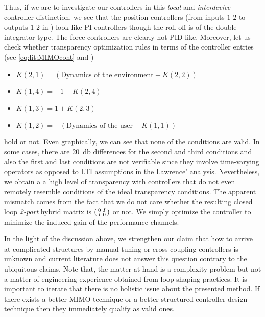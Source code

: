 Thus, if we are to investigate our controllers in this \emph{local} and \emph{interdevice} controller distinction, we see that the position 
controllers (from inputs $1$-$2$ to outputs $1$-$2$ in ) look like PI controllers though the roll-off is of the double
integrator type. The force controllers are clearly not PID-like. Moreover, let us check whether transparency optimization rules in terms of the 
controller entries (see \eqref{eq:lit:MIMOcont} and )
\begin{itemize}
    \item  $K(2,1)= (\text{Dynamics of the environment}+K(2,2))$
	\item  $K(1,4)= -1+K(2,4)$
    \item  $K(1,3)= 1+K(2,3)$
    \item  $K(1,2)= -(\text{Dynamics of the user}+K(1,1))$
\end{itemize}
hold or not. Even graphically, we can see that none of the conditions are valid. In some cases, there are \SI{20}{\decibel} differences for the second
and third conditions and also the first and last conditions are not verifiable since they involve time-varying operators as opposed to LTI assumptions in the 
Lawrence' analysis. Nevertheless, we obtain a a high level of transparency with controllers that do not even remotely resemble conditions of the 
ideal transparency conditions. The apparent mismatch comes from the fact that we do not care whether the resulting closed loop \emph{2-port} hybrid
matrix is $\begin{psmallmatrix}0&I\\I&0\end{psmallmatrix}$ or not. We simply optimize the controller to minimize the induced gain of the performance 
channels.


In the light of the discussion above, we strengthen our claim that how to arrive at complicated structures by manual tuning or cross-coupling 
controllers is unknown and current literature does not answer this question contrary to the ubiquitous claims. Note that, the matter at hand 
is a complexity problem but not a matter of engineering experience obtained from loop-shaping practices. It is important to iterate that there 
is no holistic issue about the presented method. If there exists a better MIMO technique or a better structured controller design technique then 
they immediately qualify as valid ones.



